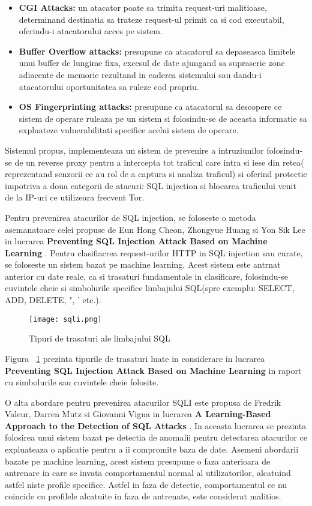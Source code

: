\begin{itemize}
	\item \textbf{CGI Attacks:} un atacator poate sa trimita request-uri malitioase, determinand destinatia sa trateze request-ul primit ca si cod executabil, oferindu-i atacatorului acces pe sistem.
	\item \textbf{Buffer Overflow attacks:} presupune ca atacatorul sa depaseasca limitele unui buffer de lungime fixa, excesul de date ajungand sa suprascrie zone adiacente de memorie rezultand in caderea sistemului sau dandu-i atacatorului oportunitatea sa ruleze cod propriu.
	\item \textbf{OS Fingerprinting attacks:} presupune ca atacatorul sa descopere ce sistem de operare ruleaza pe un sistem si folosindu-se de aceasta informatie sa expluateze vulnerabilitati specifice acelui sistem de operare.
\end{itemize}

Sistemul propus, \textit{\thesistitle} implementeaza un sistem de prevenire a intruziunilor folosindu-se de un reverse proxy pentru a intercepta tot traficul care intra si iese din retea( reprezentand senzorii ce au rol de a captura si analiza traficul) si oferind protectie impotriva a doua categorii de atacuri: SQL injection si blocarea traficului venit de la IP-uri ce utilizeara frecvent Tor.

Pentru prevenirea atacurilor de SQL injection, se foloseste o metoda asemanatoare celei propuse de Eun Hong Cheon, Zhongyue Huang si Yon Sik Lee in lucrarea \textbf{Preventing SQL Injection Attack Based on Machine Learning} \cite{sqli_how}. Pentru clasifiacrea request-urilor HTTP in SQL injection sau curate, se foloseste un sistem bazat pe machine learning. Acest sistem este antrnat anterior cu date reale, ca si trasaturi fundamentale in clasificare, folosindu-se cuvintele cheie si simbolurile specifice limbajului SQL(spre exemplu: SELECT, ADD, DELETE, ", ' etc.).

\begin{figure}[h]
\centering
\texttt{[image: sqli.png]}
\caption{Tipuri de trasaturi ale limbajului SQL}
\label{fig:sql-features}
\end{figure}

Figura ~\ref{fig:sql-features} prezinta tipurile de trasaturi luate in considerare in lucrarea \textbf{Preventing SQL Injection Attack Based on Machine Learning} in raport cu simbolurile sau cuvintele cheie folosite. 


O alta abordare pentru prevenirea atacurilor SQLI este propusa de Fredrik Valeur, Darren Mutz si Giovanni Vigna in lucrarea \textbf{A Learning-Based Approach to the Detection of SQL Attacks} \cite{sqli_how2}. In aceasta lucrarea se prezinta folosirea unui sistem bazat pe detectia de anomalii pentru detectarea atacurilor ce expluateaza o aplicatie pentru a ii compromite baza de date. Asemeni abordarii bazate pe machine learning, acest sistem presupune o faza anterioara de antrenare in care se invata comportamentul normal al utilizatorilor, alcatuind astfel niste profile specifice. Astfel in faza de detectie, comportamentul ce nu coincide cu profilele alcatuite in faza de antrenate, este considerat malitios.

